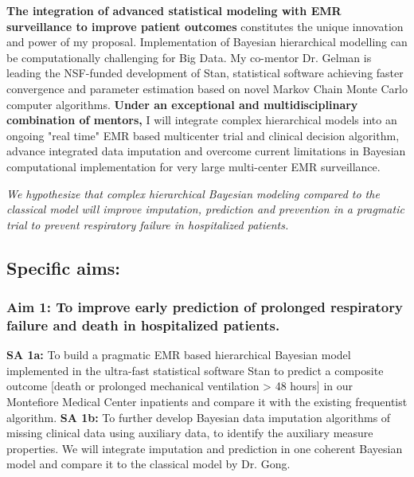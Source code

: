 \documentclass[11pt,notitlepage]{article}
\begin{document}
\newline \textbf{The integration of advanced statistical modeling with EMR surveillance to improve patient outcomes} 
constitutes the unique innovation and power of my proposal. Implementation of Bayesian hierarchical modelling can be computationally challenging for Big Data. My co-mentor Dr. Gelman is leading the NSF-funded development of Stan, statistical software achieving faster convergence and parameter estimation based on novel Markov Chain Monte Carlo computer algorithms. 
\newline \textbf {Under an exceptional and multidisciplinary combination of mentors,} I will integrate complex hierarchical models into an ongoing "real time" EMR based multicenter trial and clinical decision algorithm, advance integrated data imputation and overcome current limitations in Bayesian computational implementation for very large multi-center EMR surveillance. 

\begin{flushleft}
\textit{We hypothesize that complex hierarchical Bayesian modeling compared to the classical model will improve imputation, prediction and prevention in a pragmatic trial to prevent respiratory failure in hospitalized patients.}
\end{flushleft}

\subsection*{Specific aims:}

\subsubsection*{Aim 1: To improve early prediction of prolonged respiratory failure and death in hospitalized patients.}
\textbf{SA 1a:} To build a pragmatic EMR based hierarchical Bayesian model implemented in the ultra-fast statistical software Stan to predict a composite outcome [death or prolonged mechanical ventilation > 48 hours] in our Montefiore Medical Center inpatients and compare it with the existing frequentist algorithm. \newline \textbf{SA 1b:} To further develop Bayesian data imputation algorithms of missing clinical data using auxiliary data, to identify the auxiliary measure properties. We will integrate imputation and prediction in one coherent Bayesian model and compare it to the classical model by Dr. Gong.
\end{document}
